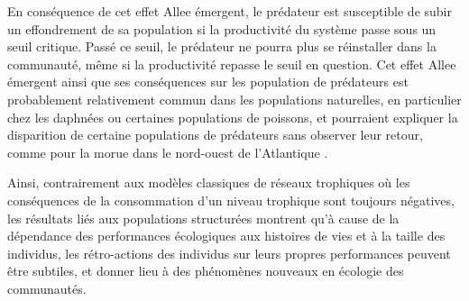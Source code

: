 En conséquence de cet effet Allee émergent, le prédateur est susceptible de
subir un effondrement de sa population si la productivité du système passe sous
un seuil critique. Passé ce seuil, le prédateur ne pourra plus se réinstaller
dans la communauté, même si la productivité repasse le seuil en question. 
Cet effet Allee émergent ainsi que ses conséquences sur les population de
prédateurs est probablement relativement commun dans les populations naturelles,
en particulier chez les daphnées \autocites{mccauley1987a} ou certaines
populations de poissons, et pourraient expliquer la disparition de certaine
populations de prédateurs sans observer leur retour, comme pour la morue dans le
nord-ouest de l'Atlantique \autocites{carscadden2001a}.

Ainsi, contrairement aux modèles classiques de réseaux  trophiques où les
conséquences de la consommation d'un niveau trophique sont toujours négatives,
les résultats liés aux populations structurées montrent qu'à cause de la
dépendance des performances écologiques aux histoires de vies et à la taille des
individus, les rétro-actions des individus sur leurs propres performances
peuvent être subtiles, et donner lieu à des phénomènes nouveaux en écologie
des communautés. 

